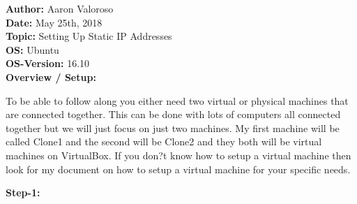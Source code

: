 \documentclass[11pt, a4papper]{article}
\begin{document}
\noindent\textbf{Author: } Aaron Valoroso \\
\textbf{Date: } May 25th, 2018 \\
\textbf{Topic: } Setting Up Static IP Addresses \\
\textbf{OS: } Ubuntu \\
\textbf{OS-Version: } 16.10 \\[1cm]

\textbf{Overview / Setup: } \\
\begin{adjustwidth}{3cm}{} 
To be able to follow along you either need two virtual or physical machines that are connected together. This can be done with lots of computers all connected together but we will just focus on just two machines. My first machine will be called Clone1 and the second will be Clone2 and they both will be virtual machines on VirtualBox. If you don?t know how to setup a virtual machine then look for my document on how to setup a virtual machine for your specific needs. \\
\end{adjustwidth}
\indent \indent \textbf{Step-1: } \\
\end{document}
